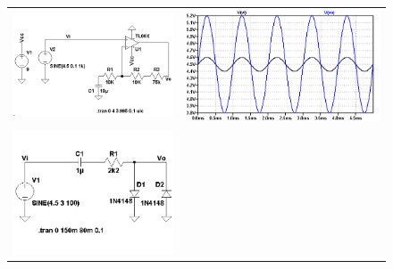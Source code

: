 \begin{figure}[H]
\begin{tabular}{c c}
        \includegraphics[scale=0.5]{../EJ5/Recursos/Simulaciones/circuito_ampli.png} &
        \includegraphics[scale=0.45]{../EJ5/Recursos/Simulaciones/medicion_ampli.png} \\
        \includegraphics[scale=0.5]{../EJ5/Recursos/Simulaciones/circuito_alineal.png} &

\end{tabular}
\end{figure}
